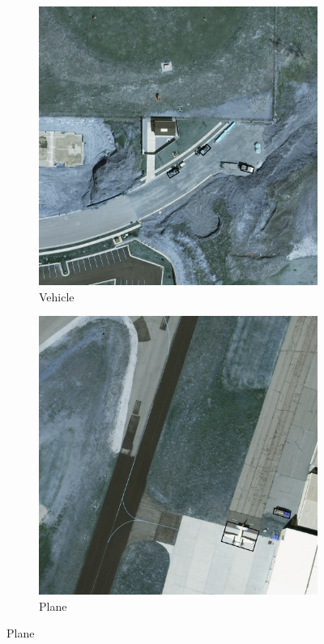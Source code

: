 \begin{figure}[h!]
    \begin{subfigure}[t]{0.38\textwidth}
        \centering
        \includegraphics[width=\linewidth]{images/015Results/02perm_exp/comp_images/ground_truth/427.png}
        \caption{Vehicle}
    \end{subfigure}
    \begin{subfigure}[t]{0.38\textwidth}
        \centering
        \includegraphics[width=\linewidth]{images/015Results/02perm_exp/comp_images/ground_truth/487.png}
        \caption{Plane}
    \end{subfigure}
    

\end{figure}
